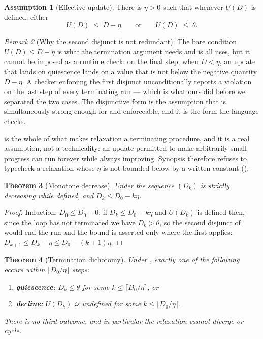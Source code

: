 \documentclass[11pt,twocolumn,a4paper]{article}
\theoremstyle{plain}
\newtheorem{theorem}{Theorem}[section]
\theoremstyle{definition}
\newtheorem{assumption}[theorem]{Assumption}
\theoremstyle{remark}
\newtheorem{remark}[theorem]{Remark}
\newcommand{\dem}{D}
\begin{document}
\begin{assumption}[Effective update]
\label{ass:effective}
There is $\eta>0$ such that whenever $U(\dem)$ is defined, either
\[
  U(\dem)\;\le\;\dem-\eta
  \qquad\text{or}\qquad
  U(\dem)\;\le\;\theta .
\]
\end{assumption}

\begin{remark}[Why the second disjunct is not redundant]
\label{rem:lastdisjunct}
The bare condition $U(\dem)\le\dem-\eta$ is what the termination argument
needs and is all  uses, but it cannot be imposed as a
runtime check: on the final step, when $\dem<\eta$, an update that lands
on quiescence lands on a value that is not below the negative quantity
$\dem-\eta$. A checker enforcing the first disjunct unconditionally
reports a violation on the last step of every terminating run --- which
is what ours did before we separated the two cases. The disjunctive form
is the assumption that is simultaneously strong enough for
 and enforceable, and it is the form the language
checks.
\end{remark}

 is the whole of what makes relaxation a
terminating procedure, and it is a real assumption, not a technicality:
an update permitted to make arbitrarily small progress can run forever
while always improving. Synopsis therefore refuses to typecheck a
relaxation whose $\eta$ is not bounded below by a written constant
().

\begin{theorem}[Monotone decrease]
\label{thm:mono}
Under  the sequence $(\dem_k)$ is strictly
decreasing while defined, and $\dem_k\le \dem_0-k\eta$.
\end{theorem}

\begin{proof}
Induction: $\dem_0\le\dem_0-0$; if $\dem_k\le\dem_0-k\eta$ and
$U(\dem_k)$ is defined then, since the loop has not terminated we have
$\dem_k>\theta$, so the second disjunct of  would
end the run and the bound is asserted only where the first applies:
$\dem_{k+1}\le \dem_k-\eta\le \dem_0-(k+1)\eta$.
\end{proof}

\begin{theorem}[Termination dichotomy]
\label{thm:dichotomy}
Under , exactly one of the following occurs within
$\lceil \dem_0/\eta\rceil$ steps:
\begin{enumerate}[label=(\roman*),leftmargin=2.2em]
\item \textbf{quiescence:} $\dem_k\le\theta$ for some
      $k\le\lceil \dem_0/\eta\rceil$; or
\item \textbf{decline:} $U(\dem_k)$ is undefined for some
      $k\le\lceil \dem_0/\eta\rceil$.
\end{enumerate}
There is no third outcome, and in particular the relaxation cannot
diverge or cycle.
\end{theorem}
\end{document}
